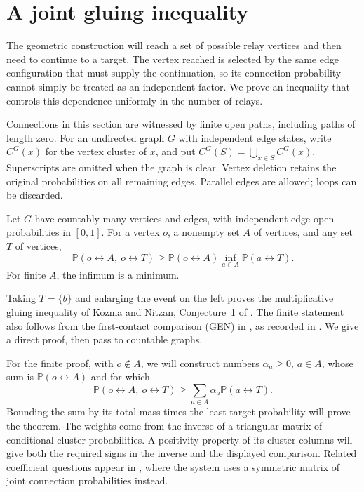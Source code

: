 \section{A joint gluing inequality}
\label{sec:gluing}

The geometric construction will reach a set of possible relay vertices and
then need to continue to a target. The vertex reached is selected by the
same edge configuration that must supply the continuation, so its
connection probability cannot simply be treated as an independent factor.
We prove an inequality that controls this dependence uniformly in the
number of relays.

Connections in this section are witnessed by finite open paths, including
paths of length zero.  For an undirected graph $G$ with independent edge
states, write $C^G(x)$ for the vertex cluster of $x$, and put
$C^G(S)=\bigcup_{x\in S}C^G(x)$.  Superscripts are omitted when the graph
is clear.  Vertex deletion retains the original probabilities on all
remaining edges.  Parallel edges are allowed; loops can be discarded.

\begin{theorem}
\label{thm:joint-gluing}
Let $G$ have countably many vertices and edges, with independent edge-open
probabilities in $[0,1]$.  For a vertex $o$, a nonempty set $A$ of vertices,
and any set $T$ of vertices,
\begin{equation}
\label{eq:joint-gluing}
 \mathbb P(o\leftrightarrow A,\ o\leftrightarrow T)
 \ge \mathbb P(o\leftrightarrow A)
          \inf_{a\in A}\mathbb P(a\leftrightarrow T).
\end{equation}
For finite $A$, the infimum is a minimum.
\end{theorem}

Taking $T=\{b\}$ and enlarging the event on the left proves the
multiplicative gluing inequality of Kozma and Nitzan,
Conjecture~1 of \cite{KozmaNitzan2024}. The finite statement also follows
from the first-contact comparison (GEN) in \cite[Section~3.4]{Leder2026},
as recorded in \cite{ConnectionInequalities2026}. We give a direct proof,
then pass to countable graphs.

For the finite proof, with $o\notin A$, we will construct numbers
$\alpha_a\ge0$, $a\in A$, whose sum is $\mathbb P(o\leftrightarrow A)$
and for which
\[
 \mathbb P(o\leftrightarrow A,\ o\leftrightarrow T)
 \ge \sum_{a\in A}\alpha_a\mathbb P(a\leftrightarrow T).
\]
Bounding the sum by its total mass times the least target probability
will prove the theorem. The weights come from the inverse of a triangular
matrix of conditional cluster probabilities. A positivity property of
its cluster columns will give both the required signs in the inverse
and the displayed comparison. Related coefficient
questions appear in \cite[Section~5.2]{KozmaNitzan2024}, where the system
uses a symmetric matrix of joint connection probabilities instead.

